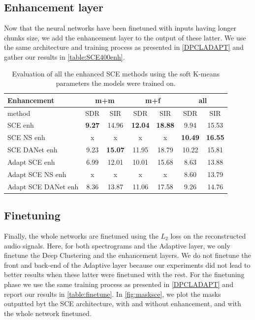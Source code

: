 \documentclass[master, tikz, final,11pt, dvipdfmx]{iscs-thesis}
\begin{document}
\subsection{Enhancement layer}
\label{enh}

Now that the neural networks have been finetuned with inputs having longer chunks size, we add the enhancement layer to the output of these latter. We use the same architecture and training process as presented in \autoref{DPCLADAPT} and gather our results in \autoref{table:SCE400enh}.

\begin{table}[h!]
\begin{tabular}{l|c|c|c|c|c|c}
Enhancement & \multicolumn{2}{c|}{m+m} & \multicolumn{2}{c|}{m+f} & \multicolumn{2}{c}{all} \\ 
\hline 
method & SDR & SIR & SDR & SIR & SDR & SIR \\ 
\hline
SCE enh & \textbf{9.27} & 14.96 & \textbf{12.04} & \textbf{18.88} & 9.94 & 15.53 \\ 
SCE NS enh & x & x & x & x & \textbf{10.49} & \textbf{16.55} \\ 
SCE DANet enh & 9.23 & \textbf{15.07} & 11.95 & 18.79 & 10.22 & 15.81 \\ 
\hline 
\hline 
Adapt SCE enh & 6.99 & 12.01 & 10.01 & 15.68 & 8.63 & 13.88 \\ 
Adapt SCE NS enh & x & x & x & x & 8.60 & 13.79 \\ 
Adapt SCE DANet enh  & 8.36 & 13.87 & 11.06 & 17.58 & 9.26 & 14.76 \\ 

\end{tabular}
\caption[Evaluation of all the enhanced SCE methods]{Evaluation of all the enhanced SCE methods using the soft K-means parameters the models were trained on.}
\label{table:SCE400enh}
\end{table}

\subsection{Finetuning}
\label{finetuning}

Finally, the whole networks are finetuned using the $L_2$ loss on the reconstructed audio signals. Here, for both spectrograms and the Adaptive layer, we only finetune the Deep Clustering and the enhancement layers. We do not finetune the front and back-end of the Adaptive layer because our experiments did not lead to better results when these latter were finetuned with the rest. For the finetuning phase we use the same training process as presented in \autoref{DPCLADAPT} and report our results in \autoref{table:finetune}. In \autoref{fig:masksce}, we plot the masks outputted byt the SCE architecture, with and without enhancement, and with the whole network finetuned.
\end{document}
